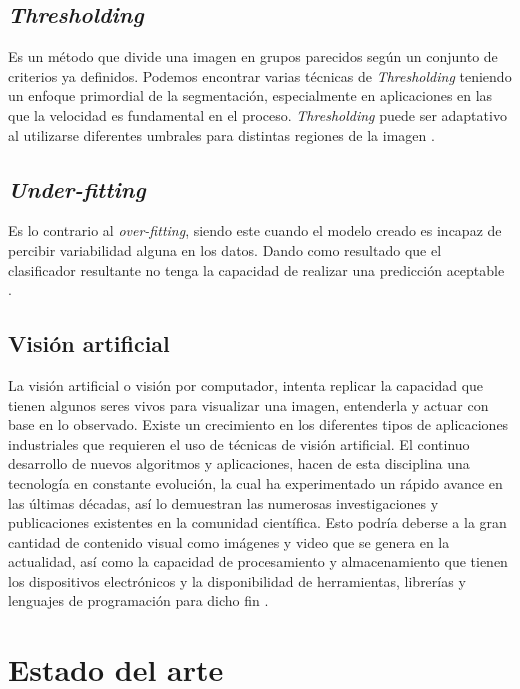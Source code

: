 \section{\textit{Thresholding}}


Es un método que divide una imagen en grupos parecidos según un conjunto de criterios ya definidos. Podemos encontrar varias técnicas de \textit{Thresholding} teniendo un enfoque primordial de la segmentación, especialmente en aplicaciones en las que la velocidad es fundamental en el proceso. \textit{Thresholding} puede ser adaptativo al utilizarse diferentes umbrales para distintas regiones de la imagen \cite{kulkarni2012color}.


\section{\textit{Under-fitting}}

Es lo contrario al \textit{over-fitting}, siendo este cuando el modelo creado es incapaz de percibir variabilidad alguna en los datos. Dando como resultado que el clasificador resultante no tenga la capacidad de realizar una predicción aceptable \cite{jabbar2015methods}.

\section{Visión artificial} La visión artificial o visión por computador, intenta replicar la capacidad que tienen algunos seres vivos para visualizar una imagen, entenderla y actuar con base en lo observado. Existe un crecimiento en los diferentes tipos de aplicaciones industriales que requieren el uso de técnicas de visión artificial. El  continuo  desarrollo  de  nuevos  algoritmos  y  aplicaciones,  hacen  de  esta  disciplina  una tecnología en constante evolución, la cual ha experimentado un rápido avance en las últimas décadas, así lo demuestran las numerosas investigaciones y publicaciones existentes en la comunidad científica.  Esto podría deberse a la gran cantidad de contenido visual como imágenes y video que se genera en  la  actualidad,  así  como  la  capacidad  de  procesamiento  y  almacenamiento  que  tienen  los dispositivos electrónicos y la disponibilidad de herramientas, librerías y lenguajes de programación para dicho fin \cite{ref_15}.






\chapter{Estado del arte}

